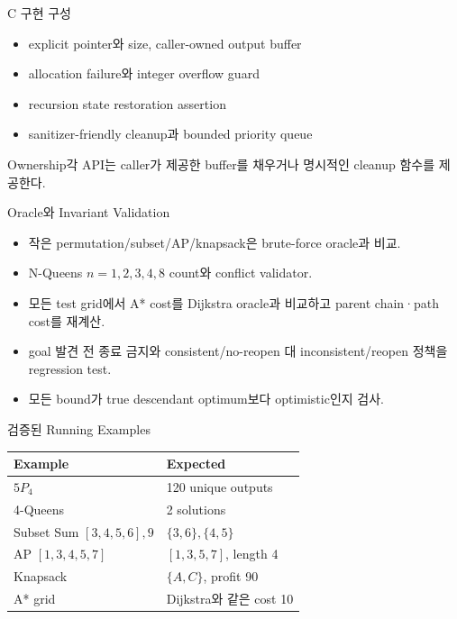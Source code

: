 \begin{frame}{C 구현 구성 \hfill \ssoptional[참고 구현]}
\small
\begin{itemize}
\item explicit pointer와 size, caller-owned output buffer
\item allocation failure와 integer overflow guard
\item recursion state restoration assertion
\item sanitizer-friendly cleanup과 bounded priority queue
\end{itemize}
\begin{block}{Ownership}각 API는 caller가 제공한 buffer를 채우거나 명시적인 cleanup 함수를 제공한다.\end{block}
\end{frame}
\begin{frame}{Oracle와 Invariant Validation}
\begin{itemize}
\item 작은 permutation/subset/AP/knapsack은 brute-force oracle과 비교.
\item N-Queens \(n=1,2,3,4,8\) count와 conflict validator.
\item 모든 test grid에서 A* cost를 Dijkstra oracle과 비교하고 parent chain·path cost를 재계산.
\item goal 발견 전 종료 금지와 consistent/no-reopen 대 inconsistent/reopen 정책을 regression test.
\item 모든 bound가 true descendant optimum보다 optimistic인지 검사.
\end{itemize}
\end{frame}
\begin{frame}{검증된 Running Examples}
\small\begin{tabular}{ll}\toprule Example&Expected\\\midrule
\(5P_4\)&120 unique outputs\\
4-Queens&2 solutions\\
Subset Sum \([3,4,5,6],9\)&\(\{3,6\},\{4,5\}\)\\
AP \([1,3,4,5,7]\)&\([1,3,5,7]\), length 4\\
Knapsack&\(\{A,C\}\), profit 90\\
A* grid&Dijkstra와 같은 cost 10\\\bottomrule
\end{tabular}
\end{frame}
